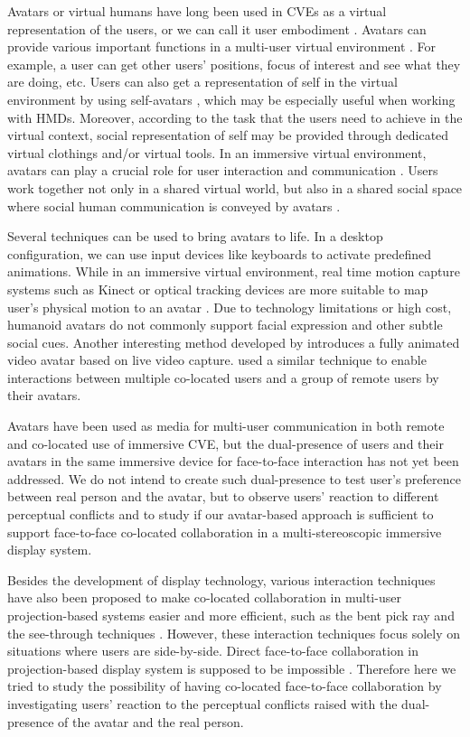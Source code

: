 Avatars or virtual humans have long been used in CVEs as a virtual representation of the users, or we can call it user embodiment \citep{Benford1995UEC}. Avatars can provide various important functions in a multi-user virtual environment \citep{Thalmann2001VHR}. For example, a user can get other users' positions, focus of interest and see what they are doing, etc. Users can also get a representation of self in the virtual environment by using self-avatars \citep{Lok2003Effects}, which may be especially useful when working with HMDs. Moreover, according to the task that the users need to achieve in the virtual context, social representation of self may be provided through dedicated virtual clothings and/or virtual tools. In an immersive virtual environment, avatars can play a crucial role for user interaction and communication \citep{Slater1994Body}. Users work together not only in a shared virtual world, but also in a shared social space where social human communication is conveyed by avatars \citep{Roberts2004SSH}.

Several techniques can be used to bring avatars to life. In a desktop configuration, we can use input devices like keyboards to activate predefined animations. While in an immersive virtual environment, real time motion capture systems such as Kinect or optical tracking devices are more suitable to map user's physical motion to an avatar \citep{Mohler2010Effect, Vera2011AugMir, Normand2012FBA}. Due to technology limitations or high cost, humanoid avatars do not commonly support facial expression and other subtle social cues. Another interesting method developed by \citet{Ogi2001SteAva} introduces a fully animated video avatar based on live video capture. \citet{Beck2013GGT} used a similar technique to enable interactions between multiple co-located users and a group of remote users by their avatars.

Avatars have been used as media for multi-user communication in both remote and co-located use of immersive CVE, but the dual-presence of users and their avatars in the same immersive device for face-to-face interaction has not yet been addressed. We do not intend to create such dual-presence to test user's preference between real person and the avatar, but to observe users' reaction to different perceptual conflicts and to study if our avatar-based approach is sufficient to support face-to-face co-located collaboration in a multi-stereoscopic immersive display system.

Besides the development of display technology, various interaction techniques have also been proposed to make co-located collaboration in multi-user projection-based systems easier and more efficient, such as the bent pick ray \citep{Riege2006Bent} and the see-through techniques \citep{Argelaguet2010STT}. However, these interaction techniques focus solely on situations where users are side-by-side. Direct face-to-face collaboration in projection-based display system is supposed to be impossible \citep{Salzmann2009CIC}. Therefore here we tried to study the possibility of having co-located face-to-face collaboration by investigating users' reaction to the perceptual conflicts raised with the dual-presence of the avatar and the real person.


